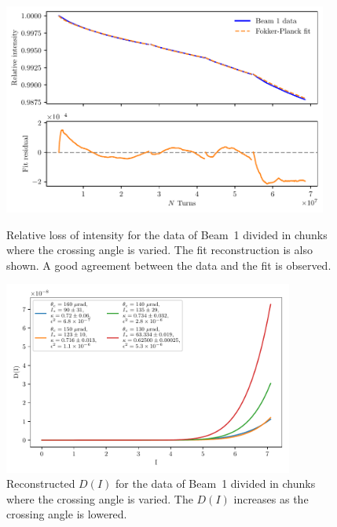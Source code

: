 \begin{figure}[hpt]
    \centering
    \includegraphics[width=0.95\textwidth]{5_wire_compensators_LHC/figs/losses_b1.pdf}
    \caption{Relative loss of intensity for the data of Beam~1 divided in chunks where the crossing angle is varied. The fit reconstruction is also shown. A good agreement between the data and the fit is observed.}
    \label{fig:reconstruction_1}
    \vspace{\floatsep}
    \includegraphics[width=0.85\textwidth]{5_wire_compensators_LHC/figs/fokker_planck_b1_D.pdf}
    \caption{Reconstructed $D(I)$ for the data of Beam~1 divided in chunks where the crossing angle is varied. The $D(I)$ increases as the crossing angle is lowered.}
    \label{fig:reconstruction_2}
\end{figure}


